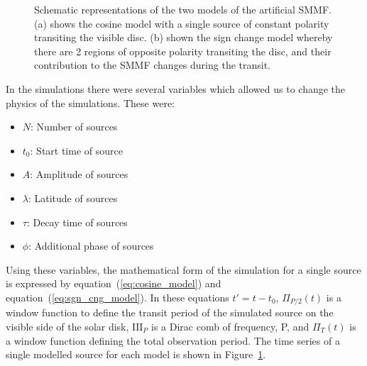 \begin{figure}
	\centering
	\qquad
	\caption{Schematic representations of the two models of the artificial SMMF. (a) shows the cosine model with a single source of constant polarity transiting the visible disc. (b) shown the sign change model whereby there are 2 regions of opposite polarity transiting the disc, and their contribution to the SMMF changes during the transit.}  \label{fig:artificial_models}
\end{figure}


In the simulations there were several variables which allowed us to change the physics of the simulations. These were:

\begin{itemize}
	\item{{\bf $N$}: Number of sources}
	\item{{\bf $t_0$}: Start time of source}
	\item{{\bf $A$}: Amplitude of sources}
	\item{{\bf $\lambda$}: Latitude of sources}
	\item{{\bf $\tau$}: Decay time of sources}
	\item{{\bf $\phi$}: Additional phase of sources}
\end{itemize}

Using these variables, the mathematical form of the simulation for a single source is expressed by equation~(\ref{eq:cosine_model}) and equation~(\ref{eq:sgn_cng_model}). In these equations $t' = t - t_0$, $\Pi_{P/2}(t)$ is a window function to define the transit period of the simulated source on the visible side of the solar disk, $\mathrm{III}_{P}$ is a Dirac comb of frequency, P, and $\Pi_{T}(t)$ is a window function defining the total observation period. The time series of a single modelled source for each model is shown in Figure~\ref{fig:artificial_models}.

